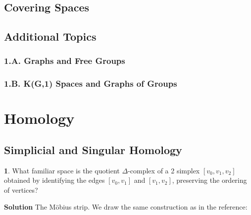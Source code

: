 \documentclass{article}
\begin{document}
\subsection{Covering Spaces}

\subsection*{Additional Topics}

\subsubsection*{1.A. Graphs and Free Groups}

\subsubsection*{1.B. K(G,1) Spaces and Graphs of Groups}

\newpage

\section{Homology}

\subsection{Simplicial and Singular Homology}

\tab\textbf{1}. What familiar space is the quotient $\Delta$-complex of a 2 simplex $[v_{0}, v_{1}, v_{2}]$ obtained by identifying the edges $[v_{0}, v_{1}]$ and $[v_{1}, v_{2}]$, preserving the ordering of vertices?
\medskip

\textbf{Solution} The Möbius strip. We draw the same construction as in the reference:
\end{document}
